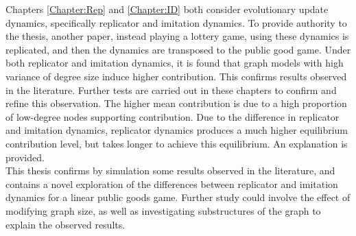 Chapters \ref{Chapter:Rep} and \ref{Chapter:ID} both consider evolutionary update dynamics, specifically replicator and imitation dynamics. To provide authority to the thesis, another paper, instead playing a lottery game, using these dynamics is replicated, and then the dynamics are transposed to the public good game. Under both replicator and imitation dynamics, it is found that graph models with high variance of degree size induce higher contribution. This confirms results observed in the literature. Further tests are carried out in these chapters to confirm and refine this observation. The higher mean contribution is due to a high proportion of low-degree nodes supporting contribution. Due to the difference in replicator and imitation dynamics, replicator dynamics produces a much higher equilibrium contribution level, but takes longer to achieve this equilibrium. An explanation is provided. \\

This thesis confirms by simulation some results observed in the literature, and contains a novel exploration of the differences between replicator and imitation dynamics for a linear public goods game. Further study could involve the effect of modifying graph size, as well as investigating substructures of the graph to explain the observed results. \\
